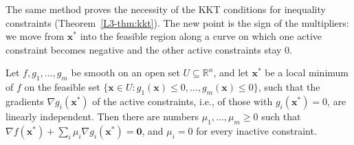 The same method proves the necessity of the KKT conditions for inequality constraints (Theorem~\ref{L3-thm:kkt}). The new point is the sign of the multipliers: we move from $\mathbf{x}^*$ into the feasible region along a curve on which one active constraint becomes negative and the other active constraints stay $0$.

\begin{theorem}\label{A-thm:kkt-proof}
    Let $f, g_1, \ldots, g_m$ be smooth on an open set $U \subseteq \mathbb{R}^n$, and let $\mathbf{x}^*$ be a local minimum of $f$ on the feasible set $\{\mathbf{x} \in U : g_1(\mathbf{x}) \leq 0, \ldots, g_m(\mathbf{x}) \leq 0\}$, such that the gradients $\nabla g_i(\mathbf{x}^*)$ of the active constraints, i.e., of those with $g_i(\mathbf{x}^*) = 0$, are linearly independent. Then there are numbers $\mu_1, \ldots, \mu_m \geq 0$ such that $\nabla f(\mathbf{x}^*) + \sum_i \mu_i\nabla g_i(\mathbf{x}^*) = \mathbf{0}$, and $\mu_i = 0$ for every inactive constraint.
\end{theorem}

